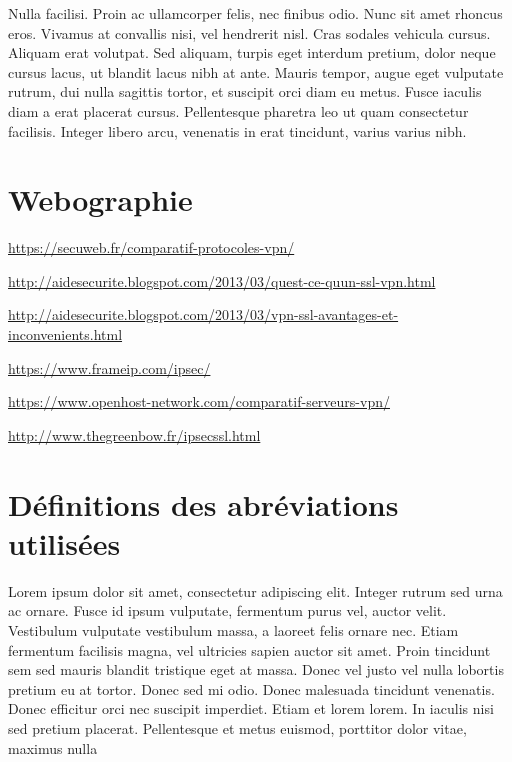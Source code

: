 \documentclass[a4paper,12pt]{report}
\begin{document}
Nulla facilisi. Proin ac ullamcorper felis, nec finibus odio. Nunc sit amet rhoncus eros. Vivamus at convallis nisi, vel hendrerit nisl. Cras sodales vehicula cursus. Aliquam erat volutpat. Sed aliquam, turpis eget interdum pretium, dolor neque cursus lacus, ut blandit lacus nibh at ante. Mauris tempor, augue eget vulputate rutrum, dui nulla sagittis tortor, et suscipit orci diam eu metus. Fusce iaculis diam a erat placerat cursus. Pellentesque pharetra leo ut quam consectetur facilisis. Integer libero arcu, venenatis in erat tincidunt, varius varius nibh.


\chapter{Webographie}  %


\url{https://secuweb.fr/comparatif-protocoles-vpn/}

\url{http://aidesecurite.blogspot.com/2013/03/quest-ce-quun-ssl-vpn.html}

\url{http://aidesecurite.blogspot.com/2013/03/vpn-ssl-avantages-et-inconvenients.html}

\url{https://www.frameip.com/ipsec/}

\url{https://www.openhost-network.com/comparatif-serveurs-vpn/}

\url{http://www.thegreenbow.fr/ipsecssl.html}

\newpage

\listoffigures

\chapter{Définitions des abréviations utilisées}
\begin{acronym}
 		  {Lorem ipsum dolor sit amet, consectetur adipiscing elit. Integer rutrum sed urna ac ornare. Fusce id
ipsum vulputate, fermentum purus vel, auctor velit. Vestibulum vulputate vestibulum massa, a laoreet
felis ornare nec. Etiam fermentum facilisis magna, vel ultricies sapien auctor sit amet. Proin tincidunt
sem sed mauris blandit tristique eget at massa. Donec vel justo vel nulla lobortis pretium eu at tortor.
Donec sed mi odio. Donec malesuada tincidunt venenatis. Donec efficitur orci nec suscipit imperdiet.
Etiam et lorem lorem. In iaculis nisi sed pretium placerat. Pellentesque et metus euismod, porttitor dolor
vitae, maximus nulla}
\end{acronym}
\end{document}
